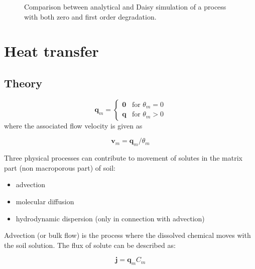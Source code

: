 \documentclass{report}
\begin{document}
\begin{figure}[h!]  %
\begin{center}
\caption{Comparison between analytical and Daisy simulation of a
process with both zero and first order degradation.}
\label{fig:solanalyt}
\end{center}
\end{figure}



\chapter{Heat transfer}

\section{Theory}

\begin{equation}
\mathbf{q}_{m} =
\begin{cases}
\mathbf{0} & \text{for\ } \theta_{m} = 0 \\
\mathbf{q} & \text{for\ } \theta_{m} > 0
\end{cases}
\end{equation}
%
where the associated flow velocity is given as

\begin{equation}
\mathbf{v}_{m}=\mathbf{q}_{m}/\theta_{m}
\end{equation}

Three physical processes can contribute to movement of solutes in
the matrix part (non macroporous part) of soil:

\begin{itemize}
\item advection
\item molecular diffusion
\item hydrodynamic dispersion (only in connection
  with advection)
\end{itemize}


Advection (or bulk flow) is the
process where the dissolved chemical moves with the soil solution.
The flux of solute can be described as:

\begin{equation}
\mathbf{j}=\mathbf{q}_{m}C_{m}
\end{equation}
\end{document}
